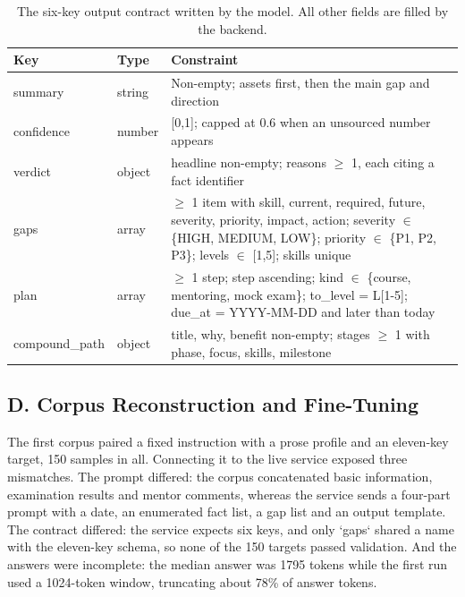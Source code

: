 \documentclass[conference]{IEEEtran}
\begin{document}
\begin{table}[t]
\caption{The six-key output contract written by the model. All other fields are filled by the backend.}
\centering
\footnotesize
\begin{tabular}{@{}p{}p{}p{}@{}}
\hline
\textbf{Key} & \textbf{Type} & \textbf{Constraint} \\ \hline
summary & string & Non-empty; assets first, then the main gap and direction \\
confidence & number & [0,1]; capped at 0.6 when an unsourced number appears \\
verdict & object & headline non-empty; reasons $\ge$ 1, each citing a fact identifier \\
gaps & array & $\ge$ 1 item with skill, current, required, future, severity, priority, impact, action; severity $\in$ \{HIGH, MEDIUM, LOW\}; priority $\in$ \{P1, P2, P3\}; levels $\in$ [1,5]; skills unique \\
plan & array & $\ge$ 1 step; step ascending; kind $\in$ \{course, mentoring, mock exam\}; to\_level = L[1-5]; due\_at = YYYY-MM-DD and later than today \\
compound\_path & object & title, why, benefit non-empty; stages $\ge$ 1 with phase, focus, skills, milestone \\
\hline
\end{tabular}
\end{table}

\subsection{D. Corpus Reconstruction and Fine-Tuning}

The first corpus paired a fixed instruction with a prose profile and an eleven-key target, 150 samples in all. Connecting it to the live service exposed three mismatches. The prompt differed: the corpus concatenated basic information, examination results and mentor comments, whereas the service sends a four-part prompt with a date, an enumerated fact list, a gap list and an output template. The contract differed: the service expects six keys, and only `gaps` shared a name with the eleven-key schema, so none of the 150 targets passed validation. And the answers were incomplete: the median answer was 1795 tokens while the first run used a 1024-token window, truncating about 78\% of answer tokens.
\end{document}
